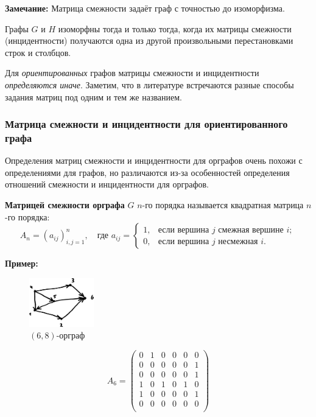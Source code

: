 \documentclass[12pt, a4paper]{article}
\begin{document}
\textbf{Замечание:} Матрица смежности задаёт граф с точностью до изоморфизма.

Графы $G$ и $H$ изоморфны тогда и только тогда, когда их матрицы смежности (инцидентности) получаются одна из другой произвольными перестановками строк и столбцов.

Для \textit{ориентированных} графов матрицы смежности и инцидентности \textit{определяются иначе}. Заметим, что в литературе встречаются разные способы задания матриц под одним и тем же названием.

\subsubsection{Матрица смежности и инцидентности для ориентированного графа}

Определения матриц смежности и инцидентности для орграфов очень похожи с определениями для графов, но различаются из-за особенностей определения отношений смежности и инцидентности для орграфов.

\textbf{Матрицей смежности орграфа} $G$ $n$-го порядка называется квадратная матрица $n$-го порядка:
\[A_n = \left( a_{ij} \right)_{i,j=1}^{n}, \quad \textrm{где } a_{ij} = \begin{cases} 1, & \textrm{если вершина } j \textrm{ смежная вершине } i; \\ 0, & \textrm{если вершина } j \textrm{ несмежная } i. \end{cases} \]

\textbf{Пример:}

\begin{figure}
  \vspace{-12mm}
  \centering
  \includegraphics[width=0.25\textwidth]{46}
  \vspace{-7mm}
 \caption{$(6,8)$-орграф}
\end{figure}

\[A_6 = \begin{pmatrix}
0 & 1 & 0 & 0 & 0 & 0 \\
0 & 0 & 0 & 0 & 0 & 1 \\
0 & 0 & 0 & 0 & 0 & 1 \\
1 & 0 & 1 & 0 & 1 & 0 \\
1 & 0 & 0 & 0 & 0 & 1 \\
0 & 0 & 0 & 0 & 0 & 0 \\
\end{pmatrix} \]
\end{document}
